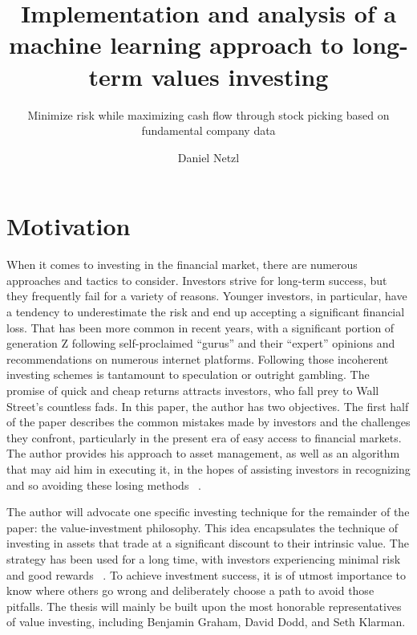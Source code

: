 \documentclass{imc-inf}
\title{Implementation and analysis of a machine learning approach to long-term values investing}
\subtitle{Minimize risk while maximizing cash flow through stock picking based on fundamental company data}
\author{Daniel Netzl}
\begin{document}
\frontmatter\maketitle{}


\begin{declarations}\end{declarations}


%
\tableofcontents%
\clearpage


%
\listoftables
\clearpage


%
\listoffigures
\clearpage


\mainmatter%

\chapter{Motivation}\label{chap:motivation}
When it comes to investing in the financial market, there are numerous approaches and tactics to consider. Investors strive for long-term success, but they frequently fail for a variety of reasons. Younger investors, in particular, have a tendency to underestimate the risk and end up accepting a significant financial loss. That has been more common in recent years, with a significant portion of generation Z following self-proclaimed “gurus” and their “expert” opinions and recommendations on numerous internet platforms. Following those incoherent investing schemes is tantamount to speculation or outright gambling. The promise of quick and cheap returns attracts investors, who fall prey to Wall Street's countless fads. In this paper, the author has two objectives. The first half of the paper describes the common mistakes made by investors and the challenges they confront, particularly in the present era of easy access to financial markets. The author provides his approach to asset management, as well as an algorithm that may aid him in executing it, in the hopes of assisting investors in recognizing and so avoiding these losing methods ~\cite{margin_of_safety}.

The author will advocate one specific investing technique for the remainder of the paper: the value-investment philosophy. This idea encapsulates the technique of investing in assets that trade at a significant discount to their intrinsic value. The strategy has been used for a long time, with investors experiencing minimal risk and good rewards ~\cite{margin_of_safety}.
To achieve investment success, it is of utmost importance to know where others go wrong and deliberately choose a path to avoid those pitfalls. The thesis will mainly be built upon the most honorable representatives of value investing, including Benjamin Graham, David Dodd, and Seth Klarman. 
\end{document}
